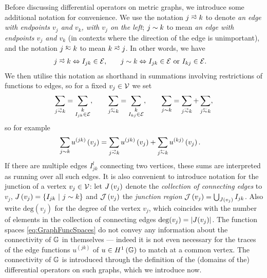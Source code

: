 Before discussing differential operators on metric graphs, we introduce some additional notation for convenience.
We use the notation $j\conLeft k$ to denote \emph{an edge with endpoints $v_j$ and $v_k$, with $v_j$ on the left}; $j\sim k$ to mean \emph{an edge with endpoints $v_j$ and $v_k$} (in contexts where the direction of the edge is unimportant), and the notation $j \conRight k$ to mean $k\conLeft j$.
In other words, we have
\begin{align*}
	j\conLeft k \Leftrightarrow I_{jk}\in \edgeSet, &\qquad
	j\con k \Leftrightarrow I_{jk}\in \edgeSet \text{ or } I_{kj}\in \edgeSet.
\end{align*}
We then utilise this notation as shorthand in summations involving restrictions of functions to edges, so for a fixed $v_j\in\mathcal{V}$ we set
\begin{align*}
	\sum_{j\conLeft k} = \sum_{\substack{k \\ I_{jk}\in \edgeSet}}, 
	\qquad 	\sum_{j\conRight k} = \sum_{\substack{k \\ I_{kj}\in \edgeSet}},
	\qquad \sum_{j\con k} = \sum_{j\conLeft k} + \sum_{j\conRight k},
\end{align*}
so for example
\begin{align*}
	\sum_{j\con k}u^{(jk)}\bracs{v_j} &= \sum_{j\conLeft k}u^{(jk)}\bracs{v_j} + \sum_{j\conRight k}u^{(kj)}\bracs{v_j}.
\end{align*}
If there are multiple edges $I_{jk}^l$ connecting two vertices, these sums are interpreted as running over all such edges.
It is also convenient to introduce notation for the junction of a vertex $v_j\in\mathcal{V}$: let $J\left( v_j \right)$ denote the \emph{collection of connecting edges} to $v_j$, $J\left( v_j \right) = \left\{ I_{jk} \ \middle\vert \  j\sim k \right\}$ and $\mathcal{J}\left( v_j \right)$ the \emph{junction region} $\mathcal{J}\left( v_j \right)=\bigcup_{J(v_j)}I_{jk}$.
Also write $\mathrm{deg}(v_j)$ for the degree of the vertex $v_j$, which coincides with the number of elements in the collection of connecting edges $\mathrm{deg}(v_j)=\left\lvert J(v_j) \right\rvert$.
The function spaces \eqref{eq:GraphFuncSpaces} do not convey any information about the connectivity of $\mathbb{G}$ in themselves --- indeed it is not even necessary for the traces of the edge functions $u^{(jk)}$ of $u\in H^1\left( \mathbb{G} \right)$ to match at a common vertex. 
The connectivity of $\mathbb{G}$ is introduced through the definition of the (domains of the) differential operators on such graphs, which we introduce now.

